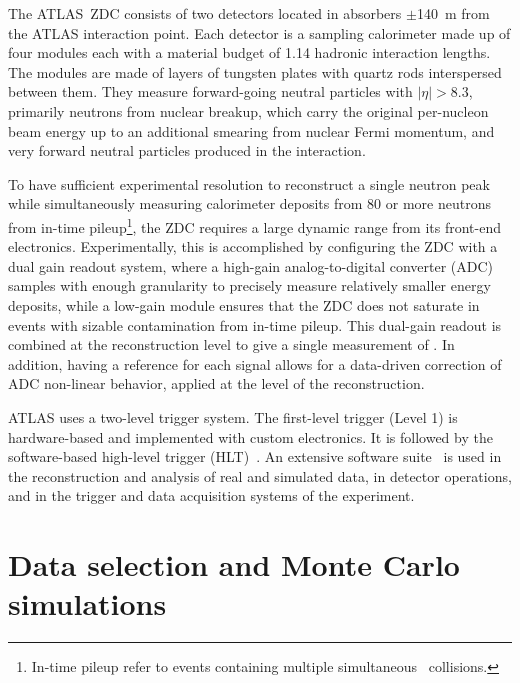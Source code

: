 \documentclass[PAPER, atlasdraft=false, USenglish, cernpreprint]{atlasdoc}
\begin{document}
The ATLAS~ZDC consists of two detectors located in absorbers $\pm$140~m from the ATLAS interaction point. 
Each detector is a sampling calorimeter made up of four modules each with a material budget of 1.14 hadronic interaction lengths. 
The modules are made of layers of tungsten plates with quartz rods interspersed between them. 
They measure forward-going neutral particles with $|\eta|>8.3$, primarily neutrons from nuclear breakup, which carry the original per-nucleon beam energy up to an additional smearing from nuclear Fermi momentum, and very forward neutral particles produced in the interaction.




To have sufficient experimental resolution to reconstruct a single neutron peak while simultaneously measuring calorimeter deposits from 80 or more neutrons from in-time pileup\footnote{In-time pileup refer to events containing multiple simultaneous \pxPb\ collisions.}, the ZDC requires a large dynamic range from its front-end electronics.  Experimentally, this is accomplished by configuring the ZDC with a dual gain readout system, where a high-gain analog-to-digital converter (ADC) samples with enough granularity to precisely measure relatively smaller energy deposits, while a low-gain module ensures that the ZDC does not saturate in events with sizable contamination from in-time pileup.  This dual-gain readout is combined at the reconstruction level to give a single measurement of \EZDC. In addition, having a reference for each signal allows for a data-driven correction of ADC non-linear behavior, applied at the level of the reconstruction.










ATLAS uses a two-level trigger system. The first-level trigger (Level 1) is hardware-based and implemented with custom electronics. 
It is followed by the software-based high-level trigger (HLT)~\cite{TRIG-2016-01}.  An extensive software suite~\cite{SOFT-2022-02-Published} is used in the reconstruction and analysis of real and simulated data, in detector operations, and in the trigger and data acquisition systems of the experiment.

 \section{Data selection and Monte Carlo simulations}
\end{document}
